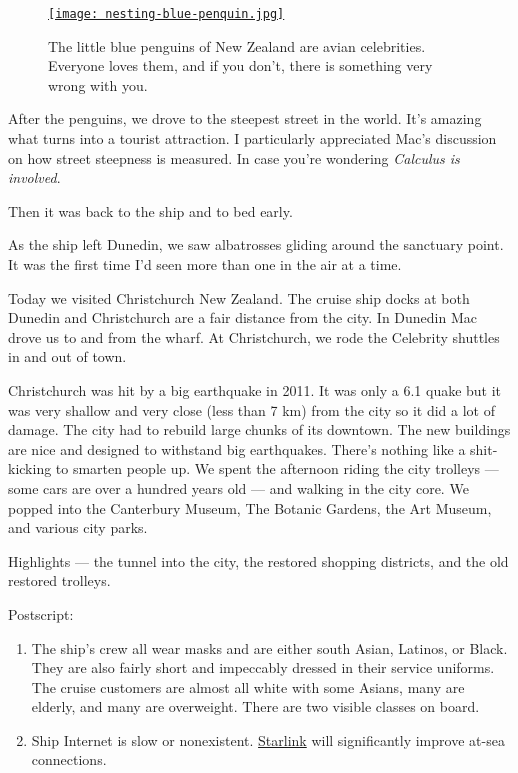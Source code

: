 \captionsetup[figure]{labelformat=empty}
\begin{SCfigure}
\centering
\href{https://conceptcontrol.smugmug.com/Trips/Overseas/Australia-New-Zealand-2022/i-mnh9FHw/A}{\texttt{[image: nesting-blue-penquin.jpg]}}
\caption[Nesting blue penguins]{The little blue penguins of New Zealand are avian celebrities.
Everyone loves them, and if you don't, there is something very wrong
with you.}
\label{fig:7606x3}
\end{SCfigure}

After the penguins, we drove to the steepest street in the world. It's
amazing what turns into a tourist attraction. I particularly appreciated
Mac's discussion on how street steepness is measured. In case you're
wondering \emph{Calculus is involved}.

Then it was back to the ship and to bed early.

As the ship left Dunedin, we saw albatrosses gliding around the
sanctuary point. It was the first time I'd seen more than one in the air
at a time.

Today we visited Christchurch New Zealand. The cruise ship docks at both
Dunedin and Christchurch are a fair distance from the city. In Dunedin
Mac drove us to and from the wharf. At Christchurch, we rode the
Celebrity shuttles in and out of town.

Christchurch was hit by a big earthquake in 2011. It was only a 6.1
quake but it was very shallow and very close (less than 7 km) from the
city so it did a lot of damage. The city had to rebuild large chunks of
its downtown. The new buildings are nice and designed to withstand big
earthquakes. There's nothing like a shit-kicking to smarten people up.
We spent the afternoon riding the city trolleys --- some cars are over a
hundred years old --- and walking in the city core. We popped into the
Canterbury Museum, The Botanic Gardens, the Art Museum, and various city
parks.

Highlights --- the tunnel into the city, the restored shopping
districts, and the old restored trolleys.

Postscript:

\begin{enumerate}
\def\labelenumi{\arabic{enumi}.}
\item
  The ship's crew all wear masks and are either south Asian, Latinos, or
  Black. They are also fairly short and impeccably dressed in their
  service uniforms. The cruise customers are almost all white with some
  Asians, many are elderly, and many are overweight. There are two
  visible classes on board.
\item
  Ship Internet is slow or nonexistent.
  \href{https://www.starlink.com/}{Starlink} will significantly improve
  at-sea connections.
\end{enumerate}

